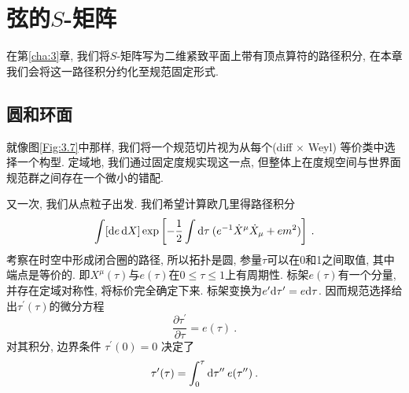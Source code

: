 
\chapter{\texorpdfstring{弦的$S$-矩阵}{5 The string S-matrix}} \label{cha:5}

在第\ref{cha:3}章, 我们将$S$-矩阵写为二维紧致平面上带有顶点算符的路径积分, 在本章我们会将这一路径积分约化至规范固定形式.


\section{\texorpdfstring{圆和环面}{5.1 The circle and the torus}} \label{sec:5.1}

就像图\ref{Fig:3.7}中那样, 我们将一个规范切片视为从每个(diff $\times $ Weyl) 等价类中选择一个构型. 定域地, 我们通过固定度规实现这一点, 
但整体上在度规空间与世界面规范群之间存在一个微小的错配.

又一次, 我们从点粒子出发. 我们希望计算欧几里得路径积分
\begin{equation}
\int[\mathrm{d} e\, \mathrm{d} X] \exp \left[-\frac{1}{2} \int \mathrm{d} \tau\: (e^{-1} \dot{X}^{\mu} \dot{X}_{\mu}+e m^{2})\right] \:. \label{5.1.1}
\end{equation}
考察在时空中形成闭合圈的路径, 所以拓扑是圆, 参量$\tau$可以在0和1之间取值, 其中端点是等价的. 即$X^{\mu}(\tau)$与$e(\tau)$在$0 \leq \tau \leq 1$上有周期性. 
标架$e(\tau)$有一个分量, 并存在定域对称性, 将标价完全确定下来. 标架变换为$e^{\prime} \mathrm{d} \tau^{\prime}=e \mathrm{d} \tau $. 
因而规范选择给出$\tau^{\prime}(\tau)$的微分方程
\begin{equation}
\frac{\partial \tau^{\prime}}{\partial \tau}=e(\tau) \:. \label{5.1.2}
\end{equation}
对其积分, 边界条件 $\tau^{\prime}(0)=0$ 决定了
\begin{equation}
	\tau^{\prime}(\tau)=\int_{0}^{\tau} \mathrm{d} \tau^{\prime \prime}\: e(\tau^{\prime \prime}) \:. \label{5.1.3}
\end{equation}

